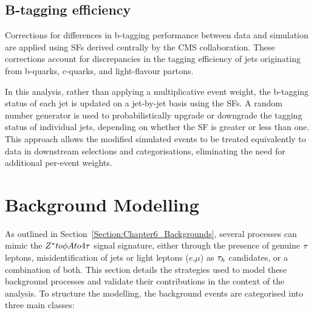 \subsection{B-tagging efficiency}

Corrections for differences in b-tagging performance between data and simulation are applied using SFs derived centrally by the CMS collaboration. These corrections account for discrepancies in the tagging efficiency of jets originating from b-quarks, c-quarks, and light-flavour partons.

In this analysis, rather than applying a multiplicative event weight, the b-tagging status of each jet is updated on a jet-by-jet basis using the SFs. A random number generator is used to probabilistically upgrade or downgrade the tagging status of individual jets, depending on whether the SF is greater or less than one. This approach allows the modified simulated events to be treated equivalently to data in downstream selections and categorisations, eliminating the need for additional per-event weights.



\section{Background Modelling}
\label{Section:Chapter6_Background_Modelling}

As outlined in Section~\ref{Section:Chapter6_Backgrounds}, several processes can mimic the $Z^* to \phi A to 4\tau$ signal signature, either through the presence of genuine $\tau$ leptons, misidentification of jets or light leptons ($e$,$\mu$) as $\tau_h$ candidates, or a combination of both. This section details the strategies used to model these background processes and validate their contributions in the context of the analysis. To structure the modelling, the background events are categorised into three main classes:


